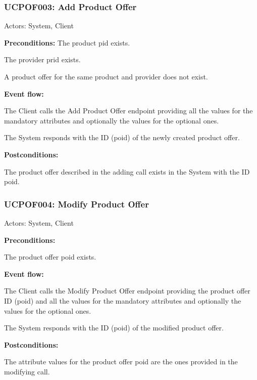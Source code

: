 \begin{ucbox}{\subsubsection{UCPOF003: Add Product Offer}}
\label{UCPOF003}

Actors: System, Client

\textbf{Preconditions:} 
\ucitem The product pid exists.

\ucitem The provider prid exists.

\ucitem A product offer for the same product and provider does not exist.

\textbf{Event flow:}

\ucitem The Client calls the Add Product Offer endpoint providing all the values for the mandatory attributes and optionally the values for the optional ones.

\ucitem The System responds with the ID (poid) of the newly created product offer.

\textbf{Postconditions:}

\ucitem The product offer described in the adding call exists in the System with the ID poid.

\end{ucbox}

\begin{ucbox}{\subsubsection{UCPOF004: Modify Product Offer}}
\label{UCPOF004}

Actors: System, Client

\textbf{Preconditions:}

\ucitem The product offer poid exists.

\textbf{Event flow:}

\ucitem The Client calls the Modify Product Offer endpoint providing the product offer ID (poid) and all the values for the mandatory attributes and optionally the values for the optional ones.

\ucitem The System responds with the ID (poid) of the modified product offer.

\textbf{Postconditions:}

\ucitem The attribute values for the product offer poid are the ones provided in the modifying call.

\end{ucbox}

